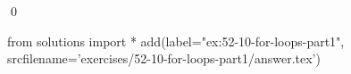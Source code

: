 
\begin{ex}
  \label{ex:52-10-for-loops-part1}
  
  \qed
\end{ex}
\begin{python0}
from solutions import *
add(label="ex:52-10-for-loops-part1",
    srcfilename='exercises/52-10-for-loops-part1/answer.tex')
\end{python0}
